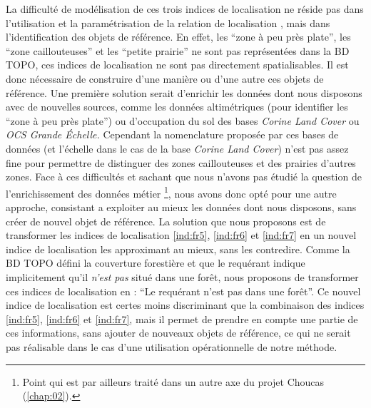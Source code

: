 La difficulté de modélisation de ces trois indices de localisation ne
réside pas dans l'utilisation et la paramétrisation de la relation de
localisation , mais dans
l'identification des objets de référence. En effet, les
\enquote{zone à peu près plate}, les
\enquote{zone caillouteuses} et les
\enquote{petite prairie} ne sont pas
représentées dans la BD TOPO, ces indices de localisation ne sont pas
directement spatialisables. Il est donc nécessaire de construire d'une
manière ou d'une autre ces objets de référence. Une première solution
serait d’enrichir les données dont nous disposons avec de nouvelles
sources, comme les données altimétriques (pour identifier les
\enquote{zone à peu près plate}) ou d'occupation
du sol des bases \emph{Corine Land Cover} ou \emph{OCS Grande
  Échelle.} Cependant la nomenclature proposée par ces bases de
données (et l'échelle dans le cas de la base \emph{Corine Land Cover})
n'est pas assez fine pour permettre de distinguer des zones
caillouteuses et des prairies d'autres zones. Face à ces difficultés
et sachant que nous n'avons pas étudié la question de l'enrichissement
des données métier \footnote{Point qui est par ailleurs traité dans un
  autre axe du projet Choucas (\autoref{chap:02}).}, nous avons donc
opté pour une autre approche, consistant a exploiter au mieux les
données dont nous disposons, sans créer de nouvel objet de
référence. La solution que nous proposons est de transformer les
indices de localisation \ref{ind:fr5}, \ref{ind:fr6} et \ref{ind:fr7}
en un nouvel indice de localisation les approximant au mieux, sans les
contredire. Comme la BD TOPO défini la couverture forestière et que le
requérant indique implicitement qu'il \emph{n'est pas} situé dans une
forêt, nous proposons de transformer ces indices de localisation en :
\enquote{Le requérant n'est pas dans une forêt}. Ce nouvel indice de
localisation est certes moins discriminant que la combinaison des
indices \ref{ind:fr5}, \ref{ind:fr6} et \ref{ind:fr7}, mais il permet
de prendre en compte une partie de ces informations, sans ajouter de
nouveaux objets de référence, ce qui ne serait pas réalisable dans le
cas d'une utilisation opérationnelle de notre méthode.

